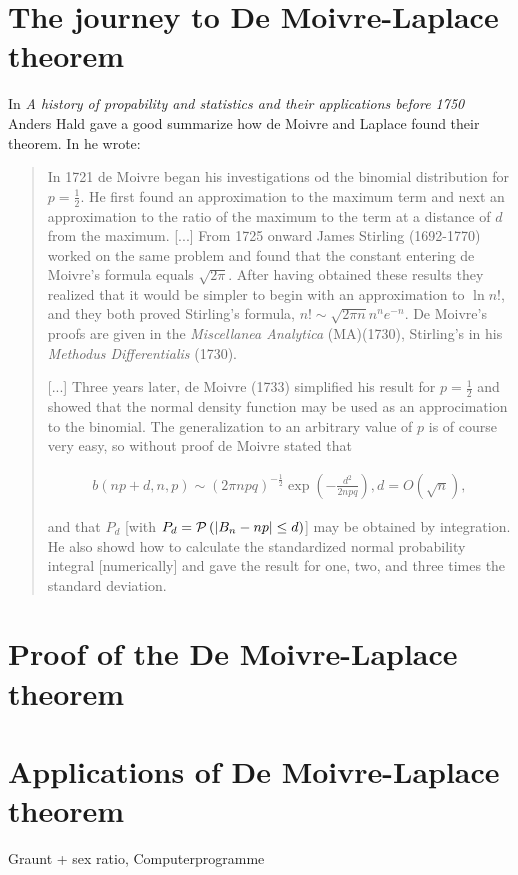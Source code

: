 \section{The journey to De Moivre-Laplace theorem}

In \emph{A history of propability and statistics and their applications before 1750} Anders Hald gave a good summarize how de Moivre and Laplace found their theorem. In \cite[pp. 469-470]{hald1} he wrote:

\begin{quotation}
  In 1721 de Moivre began his investigations od the binomial distribution for $p=\tfrac 12$. He first found an approximation to the maximum term and next an approximation to the ratio of the maximum to the term at a distance of $d$ from the maximum. [...] From 1725 onward James Stirling (1692-1770) worked on the same problem and found that the constant entering de Moivre's formula equals $\sqrt{2\pi}$. After having obtained these results they realized that it would be simpler to begin with an approximation to $\ln n!$, and they both proved Stirling's formula, $n! \sim \sqrt{2\pi n}n^ne^{-n}$. De Moivre's proofs are given in the \emph{Miscellanea Analytica} (MA)(1730), Stirling's in his \emph{Methodus Differentialis} (1730).

  [...] Three years later, de Moivre (1733) simplified his result for $p=\tfrac 12$ and showed that the normal density function may be used as an approcimation to the binomial. The generalization to an arbitrary value of $p$ is of course very easy, so without proof de Moivre stated that

  \begin{align*}
      b(np+d,n,p) \sim (2\pi npq)^{-\tfrac 12} \exp\left( -\frac{d^2}{2npq} \right), d = O(\sqrt n),
  \end{align*}

  and that $P_d$ [with $P_d=\mathcal P\left({|B_{n} -np|\le d}\right)$] may be obtained by integration. He also showd how to calculate the standardized normal probability integral [numerically] and gave the result for one, two, and three times the standard deviation.
\end{quotation}

\section{Proof of the De Moivre-Laplace theorem}

\section{Applications of De Moivre-Laplace theorem}

Graunt + sex ratio, Computerprogramme

